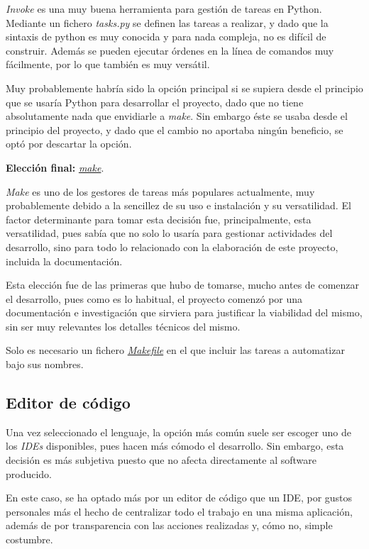 \textit{Invoke} es una muy buena herramienta para gestión de tareas en Python. Mediante un fichero \textit{tasks.py} se definen las tareas a realizar, y dado que la sintaxis de python es muy conocida y para nada compleja, no es difícil de construir. Además se pueden ejecutar órdenes en la línea de comandos muy fácilmente, por lo que también es muy versátil.

Muy probablemente habría sido la opción principal si se supiera desde el principio que se usaría Python para desarrollar el proyecto, dado que no tiene absolutamente nada que envidiarle a \textit{make}. Sin embargo éste se usaba desde el principio del proyecto, y dado que el cambio no aportaba ningún beneficio, se optó por descartar la opción.

\textbf{Elección final:} \href{https://www.gnu.org/software/make/}{\textit{make}}.

\textit{Make} es uno de los gestores de tareas más populares actualmente, muy probablemente debido a la sencillez de su uso e instalación y su versatilidad. El factor determinante para tomar esta decisión fue, principalmente, esta versatilidad, pues sabía que no solo lo usaría para gestionar actividades del desarrollo, sino para todo lo relacionado con la elaboración de este proyecto, incluida la documentación.

Esta elección fue de las primeras que hubo de tomarse, mucho antes de comenzar el desarrollo, pues como es lo habitual, el proyecto comenzó por una documentación e investigación que sirviera para justificar la viabilidad del mismo, sin ser muy relevantes los detalles técnicos del mismo.

Solo es necesario un fichero \href{https://github.com/Anglepi/My-Many-Reads/blob/main/Makefile}{\textit{Makefile}} en el que incluir las tareas a automatizar bajo sus nombres.

\subsection{Editor de código}
\label{Editor de código}

Una vez seleccionado el lenguaje, la opción más común suele ser escoger uno de los \textit{IDEs} disponibles, pues hacen más cómodo el desarrollo. Sin embargo, esta decisión es más subjetiva puesto que no afecta directamente al software producido.

En este caso, se ha optado más por un editor de código que un IDE, por gustos personales más el hecho de centralizar todo el trabajo en una misma aplicación, además de por transparencia con las acciones realizadas y, cómo no, simple costumbre.

